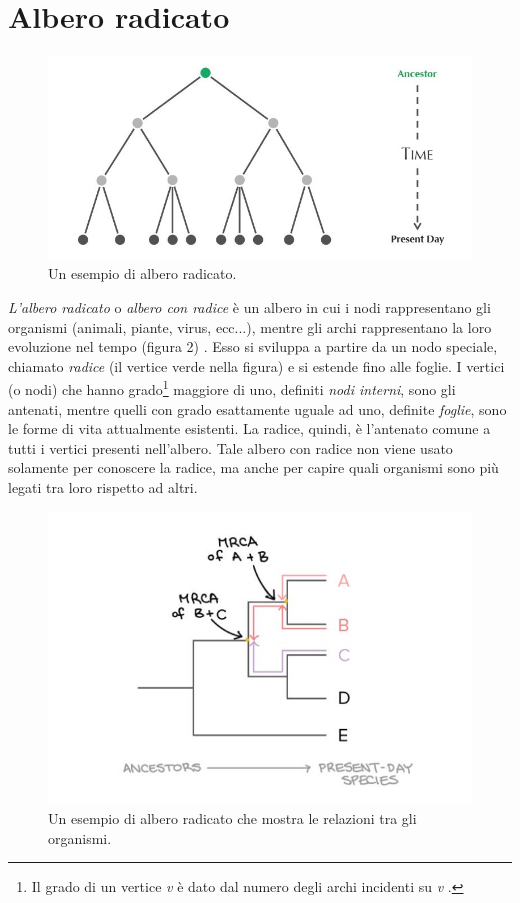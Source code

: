 \section{Albero radicato}
\begin{figure}[h!]
	\includegraphics[width=\linewidth]{rooted_tree.jpg}
 	\caption{Un esempio di albero radicato.}
  	\label{fig:RootedTree}
\end{figure}
\textit{L'albero radicato} o \textit{albero con radice} è un albero in cui i nodi rappresentano gli organismi (animali, piante, virus, ecc...), mentre gli archi rappresentano la loro evoluzione nel tempo (figura 2) \cite{bioinfalganactivelearningapproachparttwo}. Esso si sviluppa a partire da un nodo speciale, chiamato \textit{radice} (il vertice verde nella figura) e si estende fino alle foglie. I vertici (o nodi) che hanno grado\footnote{Il grado di un vertice \textit{v} è dato dal numero degli archi incidenti su \textit{v} \cite{algoritmiEStruttureDati2}.} maggiore di uno, definiti \textit{nodi interni}, sono gli antenati, mentre quelli con grado esattamente uguale ad uno, definite \textit{foglie}, sono le forme di vita attualmente esistenti. La radice, quindi, è l'antenato comune a tutti i vertici presenti nell'albero.
\newline
Tale albero con radice non viene usato solamente per conoscere la radice, ma anche per capire quali organismi sono più legati tra loro rispetto ad altri.
\newline
\begin{figure}[h!]
	\includegraphics[width=\linewidth]{rooted_tree_2.jpg}
 	\caption{Un esempio di albero radicato che mostra le relazioni tra gli organismi.}
  	\label{fig:RootedTree}
\end{figure}
